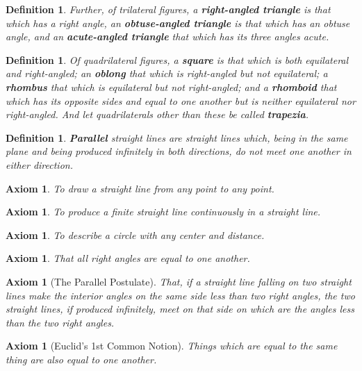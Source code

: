 \documentclass[letterpaper, 12pt]{amsart}
\newtheorem{axe}[thm]{Axiom}
\newtheorem{defn}[thm]{Definition}
\theoremstyle{definition}  %
\begin{document}
		\begin{defn}
		Further, of trilateral figures, a \textbf{right-angled triangle} is that which has a right angle, an \textbf{obtuse-angled triangle} is that which has an obtuse angle, and an \textbf{acute-angled triangle} that which has its three angles acute.
		\end{defn}

		\begin{defn}
		Of quadrilateral figures, a \textbf{square} is that which is both equilateral and right-angled; an \textbf{oblong} that which is right-angled but not equilateral; a \textbf{rhombus} that which is equilateral but not right-angled; and a \textbf{rhomboid} that which has its opposite sides and equal to one another but is neither equilateral nor right-angled.
		And let quadrilaterals other than these be called \textbf{trapezia}.
		\end{defn}

		\begin{defn}
		\textbf{Parallel} straight lines are straight lines which, being in the same plane and being produced infinitely in both directions, do not meet one another in either direction.
		\end{defn}

		\begin{axe}
		To draw a straight line from any point to any point.
		\end{axe}

		\begin{axe}
		To produce a finite straight line continuously in a straight line.
		\end{axe}

		\begin{axe}
		To describe a circle with any center and distance.
		\end{axe}

		\begin{axe}
		That all right angles are equal to one another.
		\end{axe}

		\begin{axe}[The Parallel Postulate]
		That, if a straight line falling on two straight lines make the interior angles on the same side less than two right angles, the two straight lines, if produced infinitely, meet on that side on which are the angles less than the two right angles.
		\end{axe}

		\begin{axe}[Euclid's 1st Common Notion]
		Things which are equal to the same thing are also equal to one another.
		\end{axe}
\end{document}
